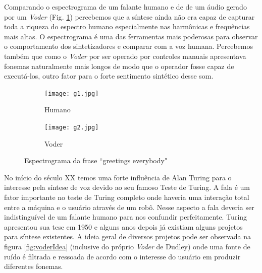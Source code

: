 
Comparando o espectrograma de um falante humano e de de um áudio gerado por um \textit{Voder} (Fig. \ref{fig:espectrograms}) percebemos que a síntese ainda não era capaz de capturar toda a riqueza do espectro humano especialmente nas harmônicas e frequências mais altas. O espectrograma é uma das ferramentas mais poderosas para observar o comportamento dos sintetizadores e comparar com a voz humana. Percebemos também que como o \textit{Voder} por ser operado por controles manuais apresentava fonemas naturalmente mais longos de modo que o operador fosse capaz de executá-los, outro fator para o forte sentimento sintético desse som.

\begin{figure}[t]
    \centering
    \begin{subfigure}[b]{\textwidth}
        \centering
        \texttt{[image: g1.jpg]}
        \caption{Humano}
    \end{subfigure}
    \begin{subfigure}[b]{\textwidth}
        \centering
        \texttt{[image: g2.jpg]}
        \caption{Voder}
    \end{subfigure}
    \caption{Espectrograma da frase ``greetings everybody"}
    \label{fig:espectrograms}
\end{figure}



No início do século XX temos uma forte influência de Alan Turing para o interesse pela síntese de voz devido ao seu famoso Teste de Turing. A fala é um fator importante no teste de Turing completo onde haveria uma interação total entre a máquina e o usuário através de um robô. Nesse aspecto a fala deveria ser indistinguível de um falante humano para nos confundir perfeitamente. Turing apresentou sua tese em 1950 e alguns anos depois já existiam alguns projetos para síntese existentes. A ideia geral de diversos projetos pode ser observada na figura \ref{fig:voderIdea} (inclusive do próprio \textit{Voder} de Dudley) onde uma fonte de ruído é filtrada e ressoada de acordo com o interesse do usuário em produzir diferentes fonemas.

